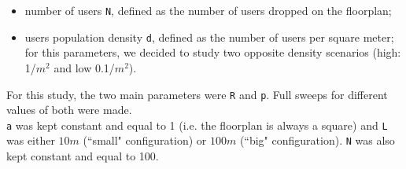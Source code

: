 \begin{itemize}
	\item number of users \colorbox{gray!30}{\large \texttt{N}}, defined
	as the number of users dropped on the floorplan;
	\item users population density \colorbox{gray!30}{\large \texttt{d}},
	defined as the number of users per square meter; for this parameters, we
	decided to study two opposite density scenarios
	(high: 1/$m^2$ and low 0.1/$m^2$).
\end{itemize}

For this study, the two main parameters were \colorbox{gray!30}{\large \texttt{R}} and \colorbox{gray!30}{\large \texttt{p}}. Full sweeps for different values of both were made. \\
\colorbox{gray!30}{\large \texttt{a}} was kept constant and equal to 1 (i.e. the floorplan is always a square) and \colorbox{gray!30}{\large \texttt{L}} was either $10 m$ (``small" configuration) or $100 m$ (``big" configuration). \colorbox{gray!30}{\large \texttt{N}} was also kept constant and equal to 100.
